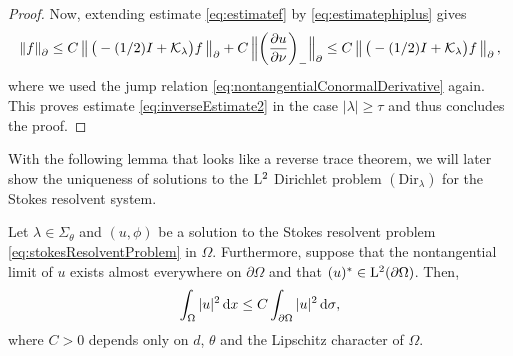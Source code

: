 \begin{proof}
  Now, extending estimate \eqref{eq:estimatef} by \eqref{eq:estimatephiplus} gives
  \begin{align*}
      \| f\|^{}_\partial 
      \leq C \, \big\| \, \big( - (1/2) I + \mathcal{K}_\lambda\big) f\, \big\|^{}_\partial + C\, \Big\| \bigg(\frac{\partial u}{\partial \nu} \bigg)_- \Big\|^{}_\partial 
    \leq C \, \big\| \, \big( - (1/2) I + \mathcal{K}_\lambda\big) f \,\big\|^{}_{\partial}\,,
  \end{align*}
  where we used the jump relation \eqref{eq:nontangentialConormalDerivative} again.
  This proves estimate \eqref{eq:inverseEstimate2} in the case $|\lambda| \geq \tau$ and thus concludes the proof.
\end{proof}

With the following lemma that looks like a reverse trace theorem, we will later show the uniqueness of solutions to the $\mathrm{L}^2$ Dirichlet problem \hyperref[eq:dirProblem]{$(\mathrm{Dir}_\lambda)$} for the Stokes resolvent system.

\begin{lem}
  \label{lem:l2unique}
  Let $\lambda \in \Sigma_\theta$ and $(u,\phi)$ be a solution to the Stokes resolvent problem \eqref{eq:stokesResolventProblem} in $\Omega$.
  Furthermore, suppose that the nontangential limit of $u$ exists almost everywhere on $\partial\Omega$ and that $(u)^* \in \mathrm{L}^2(\partial\Omega)$.
  Then,
  \begin{align}
    \label{eq:OmegaBoundaryEstimate}
    \int_\Omega |u|^2 \, {\operatorname{d}\!{x}} \leq C \int_{\partial\Omega} |u|^2 \, {\operatorname{d}\!{\sigma}},
  \end{align}
  where $C > 0$ depends only on $d$, $\theta$ and the Lipschitz character of $\Omega$.
\end{lem}

